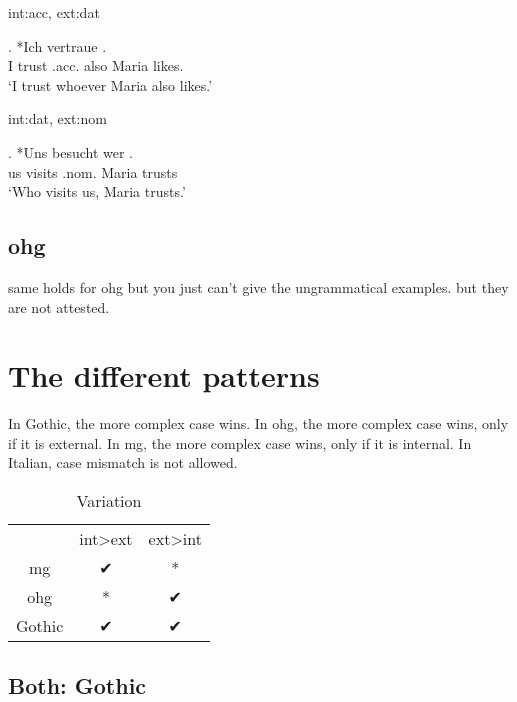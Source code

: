 \ac{int}:\ac{acc}, \ac{ext}:\ac{dat}

 \exg. *Ich vertraue    . \\
  I trust\scsub{[dat]} .\ac{acc}. also Maria likes\scsub{[acc]}.\\
  `I trust whoever Maria also likes.' 

\ac{int}:\ac{dat}, \ac{ext}:\ac{nom}

 \exg. *Uns besucht wer  .\\
  us visits\scsub{[nom]} .\ac{nom}. Maria trusts\scsub{[dat]}\\
  `Who visits us, Maria trusts.' 

\subsection{\ac{ohg}}

same holds for \ac{ohg} but you just can't give the ungrammatical examples. but they are not attested.



\section{The different patterns}

In Gothic, the more complex case wins.
In \ac{ohg}, the more complex case wins, only if it is external.
In \ac{mg}, the more complex case wins, only if it is internal.
In Italian, case mismatch is not allowed.


\begin{table}[H]
	\center
	\caption {Variation}
		\begin{tabular}{ccc}
		\toprule
		 					& \ac{int}>\ac{ext}		& \ac{ext}>\ac{int}	\\
								\cmidrule{2-3}
		\ac{mg} 	& ✔			 							&	*									\\
		\ac{ohg}	& *										&	✔									\\
		Gothic		&	✔										&	✔									\\
		\bottomrule
		\end{tabular}
\end{table}



\subsection{Both: Gothic}


